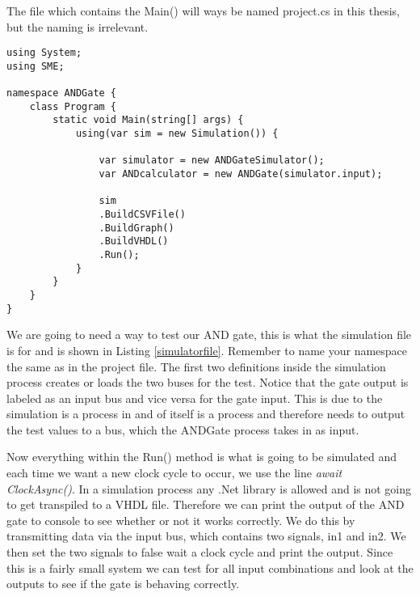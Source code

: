         The file which contains the Main() will ways be named project.cs in this thesis, but the naming is irrelevant.
         
\begin{lstlisting}[language={[Sharp]C}, caption={The project file which contains the Main() method for the project.},captionpos=b, label = projectfile]
using System;
using SME;

namespace ANDGate {
    class Program {
        static void Main(string[] args) {
            using(var sim = new Simulation()) {
            
                var simulator = new ANDGateSimulator();
                var ANDcalculator = new ANDGate(simulator.input);
                
                sim
                .BuildCSVFile()
                .BuildGraph()
                .BuildVHDL()
                .Run();
            }
        }
    }
}
\end{lstlisting}
\newpage
        We are going to need a way to test our AND gate, this is what the simulation file is for and is shown in Listing \ref{simulatorfile}. Remember to name your namespace the same as in the project file. The first two definitions inside the simulation process creates or loads the two buses for the test. Notice that the gate output is labeled as an input bus and vice versa for the gate input. This is due to the simulation is a process in and of itself is a process and therefore needs to output the test values to a bus, which the ANDGate process takes in as input.
        
        Now everything within the Run() method is what is going to be simulated and each time we want a new clock cycle to occur, we use the line \textit{await ClockAsync()}. In a simulation process any .Net library is allowed and is not going to get transpiled to a VHDL file. Therefore we can print the output of the AND gate to console to see whether or not it works correctly. We do this by transmitting data via the input bus, which contains two signals, in1 and in2. We then set the two signals to false wait a clock cycle and print the output. Since this is a fairly small system we can test for all input combinations and look at the outputs to see if the gate is behaving correctly.   

